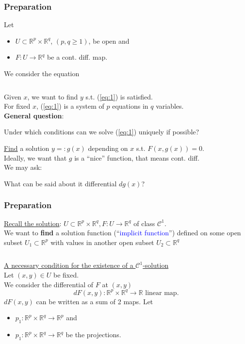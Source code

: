 \documentclass[10pt]{beamer}
\newcommand{\R}{\mathbb{R}}
\begin{document}
{\begin{frame} \frametitle{Preparation}
Let 
\begin{itemize}
\item[] $U \subset \R^p \times \R^q$, $(p,q \geq 1)$, be open and
\item[] $F: U \rightarrow \R^q$ be a cont. diff. map.
\end{itemize}
We consider the equation
\begin{block}{} 
\begin{equation} \label{eq:1}
\;
\end{equation}
\end{block}{}
Given $x$, we want to find $y$ s.t.  (\ref{eq:1}) is satisfied.\\
For fixed $x$, (\ref{eq:1}) is a system of $p$ equations in $q$ variables.\\
\vspace{0.2cm}
\textbf{General question}:
\begin{center} Under which conditions can we solve (\ref{eq:1}) uniquely if possible? \end{center}
\vspace{0.2cm}
\underline{Find} a solution $y=:g(x)$ depending on $x$ s.t. $F(x,g(x))=0$.\\
Ideally, we want that $g$ is a ``nice'' function, that means cont. diff.\\
We may ask: 
\begin{center} What can be said about it differential $dg(x)$? \end{center}
\end{frame}


\begin{frame} \frametitle{Preparation}
\underline{Recall the solution}: $U \subset \R^p \times \R^q,  F: U \rightarrow \R^q$ of class $\mathcal{C}^1$.\\
We want to \textbf{find} a solution function (``\textcolor{blue}{implicit function}'') defined on some open subset $U_1 \subset \R^p$ with values in another open subset $U_2 \subset \R^q$
\begin{block}{} 
\vspace{0.5cm}
\begin{equation*}
\;
\end{equation*}
\end{block}{}
\vspace{0.2cm}
\underline{A necessary condition for the existence of a $\mathcal{C}^1$-solution}\\
Let $(x,y) \in U$ be fixed.\\
We consider the differential of $F$ at $(x,y)$
$$dF(x,y):\R^p \times \R^q \rightarrow \R \text{ linear map}.$$
$dF(x,y)$ can be written as a sum of 2 maps. Let
\begin{itemize}
\item[] $p_1:\R^p \times \R^q \rightarrow \R^p$ and 
\item[] $p_1:\R^p \times \R^q \rightarrow \R^q$ be the projections.
\end{itemize}
\end{frame}


}
\end{document}
